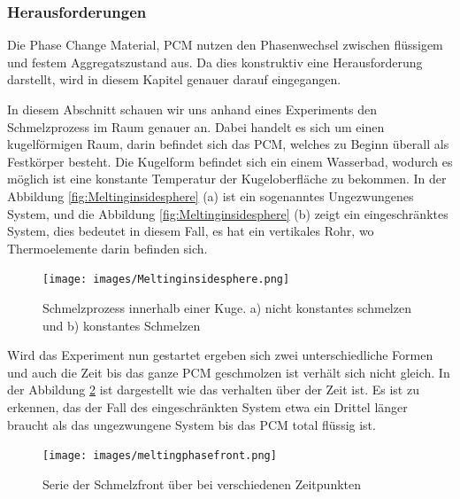 \documentclass[11pt,a4paper]{scrartcl}
\begin{document}
\subsubsection{Herausforderungen}

Die Phase Change Material, PCM nutzen den Phasenwechsel zwischen flüssigem und festem Aggregatszustand aus. Da dies konstruktiv eine Herausforderung darstellt, wird in diesem Kapitel genauer darauf eingegangen.

In diesem Abschnitt schauen wir uns anhand eines Experiments den Schmelzprozess im Raum genauer an. Dabei handelt es sich um einen kugelförmigen Raum, darin befindet sich das PCM, welches zu Beginn überall als Festkörper besteht. Die Kugelform befindet sich ein einem Wasserbad, wodurch es möglich ist eine konstante Temperatur der Kugeloberfläche zu bekommen. In der Abbildung \ref{fig:Meltinginsidesphere} (a) ist ein sogenanntes Ungezwungenes System, und die Abbildung \ref{fig:Meltinginsidesphere} (b) zeigt ein eingeschränktes System, dies bedeutet in diesem Fall, es hat ein vertikales Rohr, wo Thermoelemente darin befinden sich.

\begin{figure}[h!]
\begin{center}
\texttt{[image: images/Meltinginsidesphere.png]}
\caption{Schmelzprozess innerhalb einer Kuge. a) nicht konstantes schmelzen und b) konstantes Schmelzen \cite{WasteEnergyHarvesting}}
\label{fig:meltingpaper}
\end{center}
\end{figure}

Wird das Experiment nun gestartet ergeben sich zwei unterschiedliche Formen und auch die Zeit bis das ganze PCM geschmolzen ist verhält sich nicht gleich. In der Abbildung \ref{fig:meltingphasefront} ist dargestellt wie das verhalten über der Zeit ist. Es ist zu erkennen, das der Fall des eingeschränkten System etwa ein Drittel länger braucht als das ungezwungene System bis das PCM total flüssig ist.

\begin{figure}[h!]
\begin{center}
\texttt{[image: images/meltingphasefront.png]}
\caption{Serie der Schmelzfront über bei verschiedenen Zeitpunkten \cite{meltingpaper}}
\label{fig:meltingphasefront}
\end{center}
\end{figure}
\end{document}
